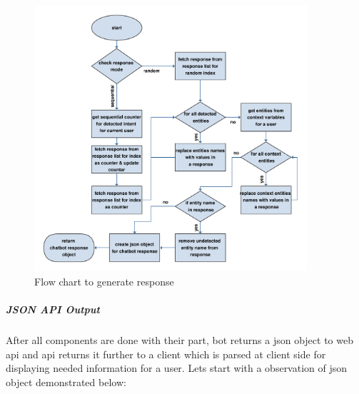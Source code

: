\begin{figure}[H]
    \centering
    \includegraphics[width=0.9\textwidth]{img/Response_generator.pdf}
    \caption{Flow chart to generate response }
    \label{fig:flowRespGen}
\end{figure}

\subparagraph*{JSON API Output}
After all components are done with their part, bot returns a json object to web api and api returns it further to a client which is parsed at client side for displaying needed information for a user. Lets start with a observation of json object demonstrated below:

